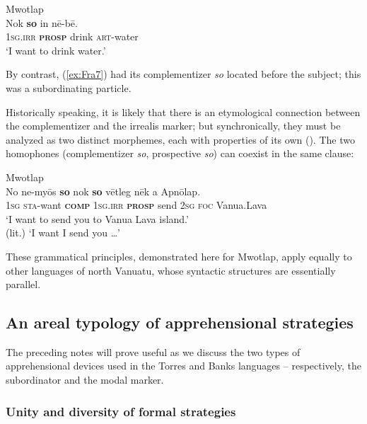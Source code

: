 \documentclass[output=paper,colorlinks,citecolor=brown]{langscibook}
\begin{document}
\ea \label{ex:Fra10} \textnormal{Mwotlap}  \\
\gll Nok \textbf{so} in nē-bē. \\
\textsc{1sg.irr} \textsc{\textbf{prosp}} drink \textsc{art}-water \\
\glt `I want to drink water.' 
\z

\noindent By contrast, (\ref{ex:Fra7}) had its complementizer \textit{so} located before the subject; this was a subordinating particle.

Historically speaking, it is likely that there is an etymological connection between the complementizer and the irrealis marker; but synchronically, they must be analyzed as two distinct morphemes, each with properties of its own (\citealt[249--257]{francois2003}). The two homophones (complementizer \textit{so}, prospective \textit{so}) can coexist in the same clause:

    \ea \label{ex:Fra11} \textnormal{Mwotlap}  \\
\gll No ne-myōs \textbf{so} nok \textbf{so} vētleg nēk a Apnōlap. \\
\textsc{1sg} \textsc{sta}-want \textsc{\textbf{comp}} \textsc{1sg.irr} \textsc{\textbf{prosp}} send \textsc{2sg} \textsc{foc} Vanua.Lava \\
\glt `I want to send you to Vanua Lava island.' \\
(lit.) `I want  I  send you {\ldots}' 
\z

These grammatical principles, demonstrated here for Mwotlap, apply equally to other languages of north Vanuatu, whose syntactic structures are essentially parallel. 





\subsection{An areal typology of apprehensional strategies}

The preceding notes will prove useful as we discuss the two types of apprehensional devices used in the Torres and Banks languages -- respectively, the subordinator and the modal marker.



\subsubsection{Unity and diversity of formal strategies}
\label{subsubsec:unityanddiversity}
\end{document}
